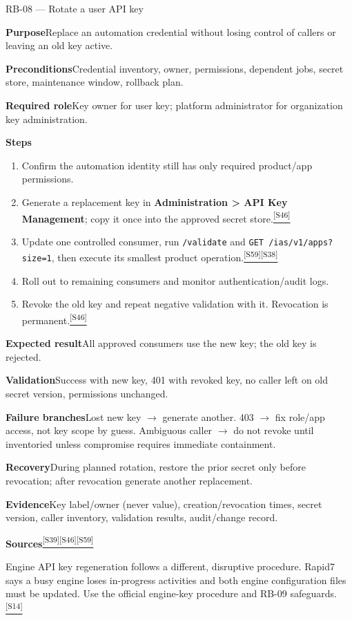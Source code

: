 \documentclass[11pt,letterpaper,oneside]{scrreprt}
\newcommand{\src}[1]{\hyperref[src:#1]{\textsuperscript{\color{R7Orange}[#1]}}}
\newcommand{\uipath}[1]{\textsf{\textbf{#1}}}
\newcommand{\code}[1]{\texttt{#1}}
\newcommand{\field}[1]{\par\smallskip\noindent\textbf{#1}\quad}
\begin{document}
\begin{procedure}{RB-08 --- Rotate a user API key}
\field{Purpose}Replace an automation credential without losing control of callers or leaving an old key active.
\field{Preconditions}Credential inventory, owner, permissions, dependent jobs, secret store, maintenance window, rollback plan.
\field{Required role}Key owner for user key; platform administrator for organization key administration.
\field{Steps}
\begin{enumerate}
  \item Confirm the automation identity still has only required product/app permissions.
  \item Generate a replacement key in \uipath{Administration > API Key Management}; copy it once into the approved secret store.\src{S46}
  \item Update one controlled consumer, run \code{/validate} and \code{GET /ias/v1/apps?size=1}, then execute its smallest product operation.\src{S59}\src{S38}
  \item Roll out to remaining consumers and monitor authentication/audit logs.
  \item Revoke the old key and repeat negative validation with it. Revocation is permanent.\src{S46}
\end{enumerate}
\field{Expected result}All approved consumers use the new key; the old key is rejected.
\field{Validation}Success with new key, 401 with revoked key, no caller left on old secret version, permissions unchanged.
\field{Failure branches}Lost new key $\rightarrow$ generate another. 403 $\rightarrow$ fix role/app access, not key scope by guess. Ambiguous caller $\rightarrow$ do not revoke until inventoried unless compromise requires immediate containment.
\field{Recovery}During planned rotation, restore the prior secret only before revocation; after revocation generate another replacement.
\field{Evidence}Key label/owner (never value), creation/revocation times, secret version, caller inventory, validation results, audit/change record.
\field{Sources}\src{S39}\src{S46}\src{S59}
\end{procedure}

\begin{safetybox}
Engine API key regeneration follows a different, disruptive procedure. Rapid7 says a busy engine loses in-progress activities and both engine configuration files must be updated. Use the official engine-key procedure and RB-09 safeguards.\src{S14}
\end{safetybox}
\end{document}
